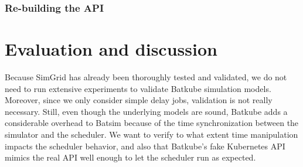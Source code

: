 \documentclass[12pt, a4paper]{memoir}
\begin{document}
%
%
%
%

\subsection{Re-building the API}

\chapter{Evaluation and discussion}

Because SimGrid has already been thoroughly tested and validated, we do not
need to run extensive experiments to validate Batkube simulation models.
Moreover, since we only consider simple delay jobs, validation is not really
necessary. Still, even though the underlying models are sound, Batkube adds a
considerable overhead to Batsim because of the time synchronization between the
simulator and the scheduler. We want to verify to what extent time manipulation
impacts the scheduler behavior, and also that Batkube's fake Kubernetes API
mimics the real API well enough to let the scheduler run as expected.
\end{document}
